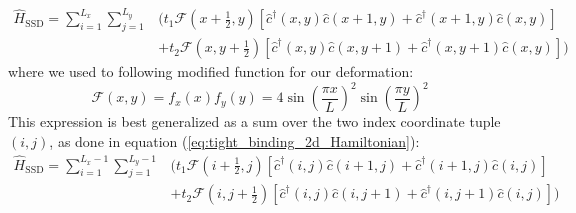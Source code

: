 \documentclass[11pt, a4paper, oneside]{book}
\theoremstyle{definition} %
\begin{document}
\begin{equation}
\begin{split}
\hat{H}_\text{SSD} = \sum_{i=1}^{L_x} \sum_{j=1}^{L_y} & \Big(t_1 \mathcal{F}\left(x+\frac{1}{2}, y\right) \left[ \hat{c}^\dagger(x,y)\hat{c}(x+1, y) + \hat{c}^\dagger(x+1,y) \hat{c}(x,y)\right] \\
&+ t_2 \mathcal{F}\left(x, y+ \frac{1}{2}\right) \left[\hat{c}^\dagger(x, y) \hat{c}(x, y + 1) + \hat{c}^\dagger(x, y+1) \hat{c}(x,y) \right] \Big)
\end{split}
\label{eq:SSD_Hamiltonian2D}
\end{equation}
where we used to following modified function for our deformation:
\begin{equation}
	\mathcal{F}(x,y) = f_x(x)f_y(y) = 4\sin(\frac{\pi x}{L})^2\sin(\frac{\pi y}{L})^2
	\label{eq:sine_squared_deformation2d}
\end{equation}
This expression is best generalized as a sum over the two index coordinate tuple $(i, j)$, as done in equation (\ref{eq:tight_binding_2d_Hamiltonian}):
\begin{equation}
	\begin{split}
		\hat{H}_\text{SSD} = \sum_{i=1}^{L_x-1} \sum_{j=1}^{L_y-1} & \Big(t_1 \mathcal{F}\left(i+\frac{1}{2}, j\right) \left[ \hat{c}^\dagger(i,j)\hat{c}(i+1, j) + \hat{c}^\dagger(i+1,j) \hat{c}(i,j)\right] \\
&+ t_2 \mathcal{F}\left(i, j + \frac{1}{2}\right) \left[\hat{c}^\dagger(i, j) \hat{c}(i, j + 1) + \hat{c}^\dagger(i, j+1) \hat{c}(i,j) \right]\Big)
	\end{split}
\end{equation}
\end{document}
